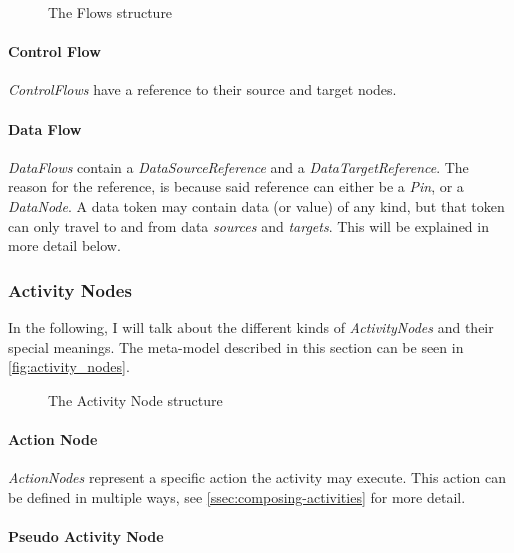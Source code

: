 \begin{figure}[!ht]
	\centering
	
	\caption{The Flows structure}
	\label{fig:flows}
\end{figure}

\paragraph{Control Flow}

\emph{ControlFlows} have a reference to their source and target nodes.

\paragraph{Data Flow}\label{par:data_flow}

\emph{DataFlows} contain a \emph{DataSourceReference} and a \emph{DataTargetReference}. The reason for the reference, is because said reference can either be a \emph{Pin}, or a \emph{DataNode}. A data token may contain data (or value) of any kind, but that token can only travel to and from data \emph{sources} and \emph{targets}. This will be explained in more detail below.

\subsubsection{Activity Nodes}\label{ssec:activity_nodes}

In the following, I will talk about the different kinds of \emph{ActivityNodes} and their special meanings. The meta-model described in this section can be seen in \autoref{fig:activity_nodes}.

\begin{figure}[!ht]
	\centering
	
	\caption{The Activity Node structure}
	\label{fig:activity_nodes}
\end{figure}

\paragraph{Action Node}

\emph{ActionNodes} represent a specific action the activity may execute. This action can be defined in multiple ways, see \autoref{ssec:composing-activities} for more detail.

\paragraph{Pseudo Activity Node}

